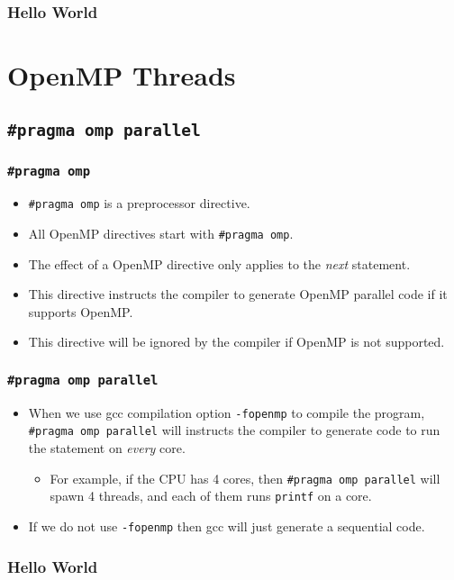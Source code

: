 \documentclass{beamer}
\begin{document}

\begin{frame}
\frametitle{Hello World} 
\end{frame}

\section{OpenMP Threads}

\subsection{\tt \#pragma omp parallel}

\begin{frame}
\frametitle{\tt \#pragma omp} 
\begin{itemize}
\item {\tt \#pragma omp} is a preprocessor directive.
\item All OpenMP directives start with {\tt \#pragma omp}.
\item The effect of a OpenMP directive only applies to the {\em next}
  statement.
\item This directive instructs the compiler to generate OpenMP
  parallel code if it supports OpenMP.
\item This directive will be ignored by the compiler if OpenMP is not
  supported.
\end{itemize}
\end{frame}

\begin{frame}
\frametitle{\tt \#pragma omp parallel} 
\begin{itemize}
\item When we use gcc compilation option {\tt -fopenmp} to compile the
  program, {\tt \#pragma omp parallel} will instructs the compiler to
  generate code to run the statement on {\em every} core.
\begin{itemize}
\item For example, if the CPU has 4 cores, then {\tt \#pragma omp
  parallel} will spawn 4 threads, and each of them runs {\tt printf}
  on a core.
\end{itemize}
\item If we do not use {\tt -fopenmp} then gcc will just generate a
  sequential code.
\end{itemize}
\end{frame}

\begin{frame}
\frametitle{Hello World} 
\end{frame}
\end{document}
